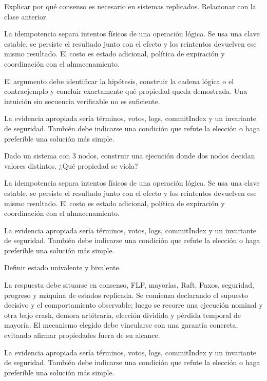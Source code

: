 \documentclass[variant=guia,cover=institutional,mode=screen]{ua-engineering-v6-article}
\begin{document}
\begin{uaexercise}
Explicar por qué consenso es necesario en sistemas replicados.
Relacionar con la clase anterior.
\end{uaexercise}
\begin{uaanswer}
La idempotencia separa intentos físicos de una operación lógica. Se usa una clave estable, se persiste el resultado junto con el efecto y los reintentos devuelven ese mismo resultado. El costo es estado adicional, política de expiración y coordinación con el almacenamiento.

El argumento debe identificar la hipótesis, construir la cadena lógica o el contraejemplo y concluir exactamente qué propiedad queda demostrada. Una intuición sin secuencia verificable no es suficiente.

La evidencia apropiada sería términos, votos, logs, commitIndex y un invariante de seguridad. También debe indicarse una condición que refute la elección o haga preferible una solución más simple.
\end{uaanswer}

\begin{uaexercise}
Dado un sistema con 3 nodos, construir una ejecución donde dos nodos decidan valores distintos.
¿Qué propiedad se viola?
\end{uaexercise}
\begin{uaanswer}
La idempotencia separa intentos físicos de una operación lógica. Se usa una clave estable, se persiste el resultado junto con el efecto y los reintentos devuelven ese mismo resultado. El costo es estado adicional, política de expiración y coordinación con el almacenamiento.

La evidencia apropiada sería términos, votos, logs, commitIndex y un invariante de seguridad. También debe indicarse una condición que refute la elección o haga preferible una solución más simple.
\end{uaanswer}

\begin{uaexercise}
Definir estado univalente y bivalente.
\end{uaexercise}
\begin{uaanswer}
La respuesta debe situarse en consenso, FLP, mayorías, Raft, Paxos, seguridad, progreso y máquina de estados replicada. Se comienza declarando el supuesto decisivo y el comportamiento observable; luego se recorre una ejecución nominal y otra bajo crash, demora arbitraria, elección dividida y pérdida temporal de mayoría. El mecanismo elegido debe vincularse con una garantía concreta, evitando afirmar propiedades fuera de su alcance.

La evidencia apropiada sería términos, votos, logs, commitIndex y un invariante de seguridad. También debe indicarse una condición que refute la elección o haga preferible una solución más simple.
\end{uaanswer}
\end{document}
